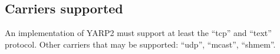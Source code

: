 \documentclass[a4]{article}
\begin{document}






\subsection{Carriers supported}

An implementation of YARP2 must support at least the ``tcp''
and ``text'' protocol.  Other carriers that may be supported:
``udp'', ``mcast'', ``shmem''.
\end{document}
